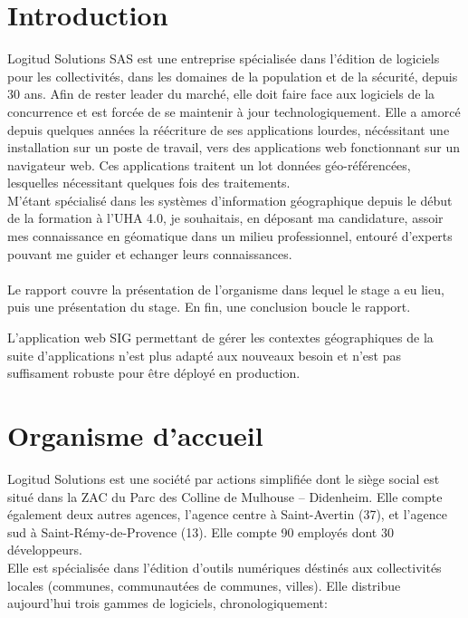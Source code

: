 \documentclass{rapportUHA40}
\begin{document}

\tabledematieres%

\setcounter{figure}{0}%


\section{Introduction}
Logitud Solutions SAS est une entreprise spécialisée dans l'édition de
logiciels pour les collectivités, dans les domaines de la population et de la
sécurité, depuis 30 ans. Afin de rester leader du marché, elle doit faire face
aux logiciels de la concurrence et est forcée de se maintenir à jour
technologiquement. Elle a amorcé depuis quelques années la réécriture de ses
applications lourdes, nécéssitant une installation sur un poste de travail,
vers des applications web fonctionnant sur un navigateur web. Ces applications
traitent un lot données géo-référencées, lesquelles nécessitant quelques fois
des traitements. \\

M'étant spécialisé dans les systèmes d'information géographique depuis le début
de la formation à l'UHA 4.0, je souhaitais, en déposant ma candidature, assoir
mes connaissance en géomatique dans un milieu professionnel, entouré d'experts
pouvant me guider et echanger leurs connaissances. \\\\

Le rapport couvre la présentation de l'organisme dans lequel le stage a eu
lieu, puis une présentation du stage. En fin, une conclusion boucle le rapport.

L'application web SIG permettant de gérer les contextes géographiques de la
suite d'applications n'est plus adapté aux nouveaux besoin et n'est pas
suffisament robuste pour être déployé en production.

\newpage

\section{Organisme d'accueil}
Logitud Solutions est une société par actions simplifiée dont le siège social
est situé dans la ZAC du Parc des Colline de Mulhouse – Didenheim. Elle compte
également deux autres agences, l'agence centre à Saint-Avertin (37), et
l’agence sud à Saint-Rémy-de-Provence (13). Elle compte 90 employés dont 30
développeurs. \\ Elle est spécialisée dans l'édition d'outils numériques
déstinés aux collectivités locales (communes, communautées de communes,
villes). Elle distribue aujourd'hui trois gammes de logiciels,
chronologiquement:
\end{document}

